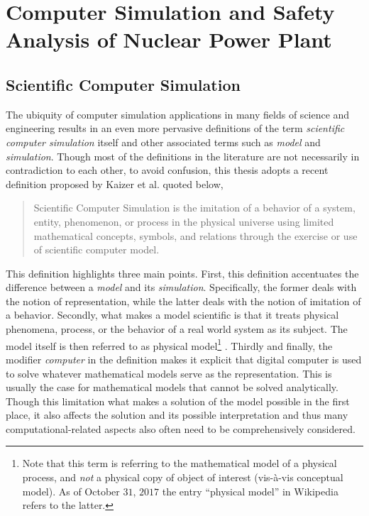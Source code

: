 \newpage
\section{Computer Simulation and Safety Analysis of Nuclear Power Plant}\label{sec:intro_computer_simulation}

\subsection{Scientific Computer Simulation}\label{sub:intro_scientific_computer_simulation}

The ubiquity of computer simulation applications in many fields of science and engineering results in an even more pervasive definitions of the term \textit{scientific computer simulation} itself and other associated terms such as \textit{model} and \textit{simulation}.
Though most of the definitions in the literature are not necessarily in contradiction to each other, 
to avoid confusion, this thesis adopts a recent definition proposed by Kaizer et al.\cite{Kaizer2015} quoted below,
\begin{quote}
	Scientific Computer Simulation is the imitation of a behavior of a system, entity, phenomenon, or process in the physical universe 
	using limited mathematical concepts, symbols, and relations through the exercise or use of scientific computer model.
\end{quote}

This definition highlights three main points.
First, this definition accentuates the difference between a \emph{model} and its \emph{simulation}.
Specifically, the former deals with the notion of representation, while the latter deals with the notion of imitation of a behavior.
Secondly, what makes a model scientific is that it treats physical phenomena, process, or the behavior of a real world system as its subject.
The model itself is then referred to as physical model\footnote{Note that this term is referring to the mathematical model of a physical process, and \emph{not} a physical copy of object of interest (vis-à-vis conceptual model). As of October $31$, $2017$ the entry ``physical model'' in Wikipedia refers to the latter.} .
Thirdly and finally, the modifier \emph{computer} in the definition makes it explicit that digital computer is used to solve whatever mathematical models serve as the representation.
This is usually the case for mathematical models that cannot be solved analytically.
Though this limitation what makes a solution of the model possible in the first place, 
it also affects the solution and its possible interpretation and thus many computational-related aspects also often need to be comprehensively considered.

